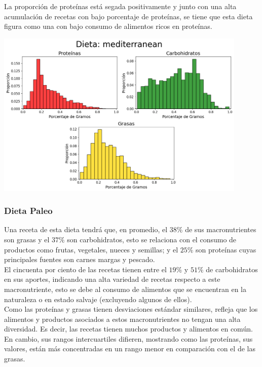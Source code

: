 \documentclass[12pt,a4paper]{article}
\begin{document}
            La proporción de proteínas está segada positivamente y junto con una 
            alta acumulación de recetas con bajo porcentaje de proteínas, se tiene que 
            esta dieta figura como una con bajo consumo de alimentos ricos en proteínas. 
            
            \begin{center}
                \includegraphics[width=0.90\textwidth]{Resources/2_03_plot_03.png}
            \end{center}

        \subsubsection{Dieta Paleo}

            Una receta de esta dieta tendrá que, en promedio, el $38\%$ de sus 
            macronutrientes son grasas y el $37\%$ son carbohidratos, esto se 
            relaciona con el consumo de productos como frutas, vegetales, nueces 
            y semillas; y el $25\%$ son proteínas cuyas principales fuentes son 
            carnes margas y pescado.\\

            El cincuenta por ciento de las recetas tienen entre el $19\%$ y $51\%$ 
            de carbohidratos en sus aportes, indicando una alta variedad de recetas 
            respecto a este macronutriente, esto se debe al consumo de alimentos que 
            se encuentran en la naturaleza o en estado salvaje (excluyendo algunos 
            de ellos).\\

            Como las proteínas y grasas tienen desviaciones estándar similares, refleja 
            que los alimentos y productos asociados a estos macronutrientes no tengan 
            una alta diversidad. Es decir, las recetas tienen muchos productos y alimentos 
            en común. En cambio, sus rangos intercuartiles difieren, mostrando como 
            las proteínas, sus valores, están más concentradas en un rango menor en 
            comparación con el de las grasas.
\end{document}
